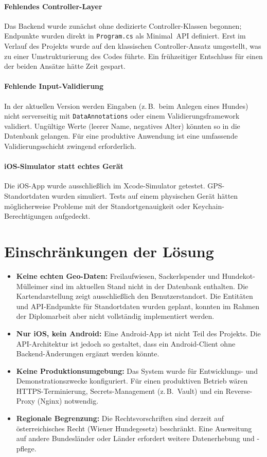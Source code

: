 \paragraph{Fehlendes Controller-Layer}
Das Backend wurde zunächst ohne dedizierte Controller-Klassen begonnen; Endpunkte wurden
direkt in \texttt{Program.cs} als Minimal~API definiert. Erst im Verlauf des Projekts
wurde auf den klassischen Controller-Ansatz umgestellt, was zu einer Umstrukturierung
des Codes führte. Ein frühzeitiger Entschluss für einen der beiden Ansätze hätte Zeit
gespart.

\paragraph{Fehlende Input-Validierung}
In der aktuellen Version werden Eingaben (z.\,B.\ beim Anlegen eines Hundes) nicht
serverseitig mit \texttt{DataAnnotations} oder einem Validierungsframework validiert.
Ungültige Werte (leerer Name, negatives Alter) könnten so in die Datenbank gelangen.
Für eine produktive Anwendung ist eine umfassende Validierungsschicht zwingend erforderlich.

\paragraph{iOS-Simulator statt echtes Gerät}
Die iOS-App wurde ausschließlich im Xcode-Simulator getestet. GPS-Standortdaten wurden
simuliert. Tests auf einem physischen Gerät hätten möglicherweise Probleme mit der
Standortgenauigkeit oder Keychain-Berechtigungen aufgedeckt.

\section{Einschränkungen der Lösung}
\label{sec:einschraenkungen}

\begin{itemize}
  \item \textbf{Keine echten Geo-Daten:} Freilaufwiesen, Sackerlspender und
    Hundekot-Mülleimer sind im aktuellen Stand nicht in der Datenbank enthalten.
    Die Kartendarstellung zeigt ausschließlich den Benutzerstandort. Die Entitäten und
    API-Endpunkte für Standortdaten wurden geplant, konnten im Rahmen der Diplomarbeit
    aber nicht vollständig implementiert werden.
  \item \textbf{Nur iOS, kein Android:} Eine Android-App ist nicht Teil des Projekts.
    Die API-Architektur ist jedoch so gestaltet, dass ein Android-Client ohne
    Backend-Änderungen ergänzt werden könnte.
  \item \textbf{Keine Produktionsumgebung:} Das System wurde für Entwicklungs- und
    Demonstrationszwecke konfiguriert. Für einen produktiven Betrieb wären HTTPS-Terminierung,
    Secrets-Management (z.\,B.\ Vault) und ein Reverse-Proxy (Nginx) notwendig.
  \item \textbf{Regionale Begrenzung:} Die Rechtsvorschriften sind derzeit auf
    österreichisches Recht (Wiener Hundegesetz) beschränkt. Eine Ausweitung auf andere
    Bundesländer oder Länder erfordert weitere Datenerhebung und -pflege.
\end{itemize}

